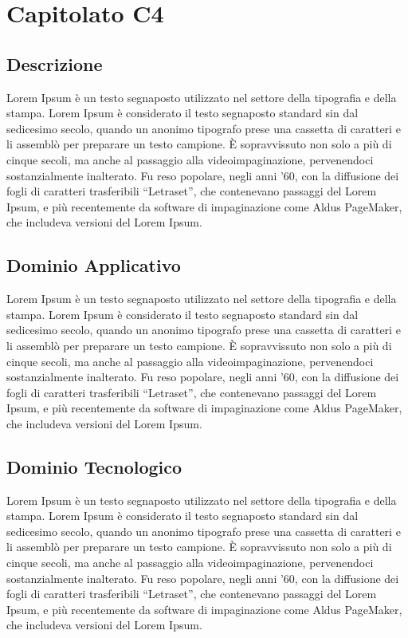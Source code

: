 \section{Capitolato C4}
\subsection{Descrizione}
Lorem Ipsum è un testo segnaposto utilizzato nel settore della tipografia e della stampa. Lorem Ipsum è considerato il testo segnaposto standard sin dal sedicesimo secolo, quando un anonimo tipografo prese una cassetta di caratteri e li assemblò per preparare un testo campione. È sopravvissuto non solo a più di cinque secoli, ma anche al passaggio alla videoimpaginazione, pervenendoci sostanzialmente inalterato. Fu reso popolare, negli anni ’60, con la diffusione dei fogli di caratteri trasferibili “Letraset”, che contenevano passaggi del Lorem Ipsum, e più recentemente da software di impaginazione come Aldus PageMaker, che includeva versioni del Lorem Ipsum.

\subsection{Dominio Applicativo}
Lorem Ipsum è un testo segnaposto utilizzato nel settore della tipografia e della stampa. Lorem Ipsum è considerato il testo segnaposto standard sin dal sedicesimo secolo, quando un anonimo tipografo prese una cassetta di caratteri e li assemblò per preparare un testo campione. È sopravvissuto non solo a più di cinque secoli, ma anche al passaggio alla videoimpaginazione, pervenendoci sostanzialmente inalterato. Fu reso popolare, negli anni ’60, con la diffusione dei fogli di caratteri trasferibili “Letraset”, che contenevano passaggi del Lorem Ipsum, e più recentemente da software di impaginazione come Aldus PageMaker, che includeva versioni del Lorem Ipsum.

\subsection{Dominio Tecnologico}
Lorem Ipsum è un testo segnaposto utilizzato nel settore della tipografia e della stampa. Lorem Ipsum è considerato il testo segnaposto standard sin dal sedicesimo secolo, quando un anonimo tipografo prese una cassetta di caratteri e li assemblò per preparare un testo campione. È sopravvissuto non solo a più di cinque secoli, ma anche al passaggio alla videoimpaginazione, pervenendoci sostanzialmente inalterato. Fu reso popolare, negli anni ’60, con la diffusione dei fogli di caratteri trasferibili “Letraset”, che contenevano passaggi del Lorem Ipsum, e più recentemente da software di impaginazione come Aldus PageMaker, che includeva versioni del Lorem Ipsum.

